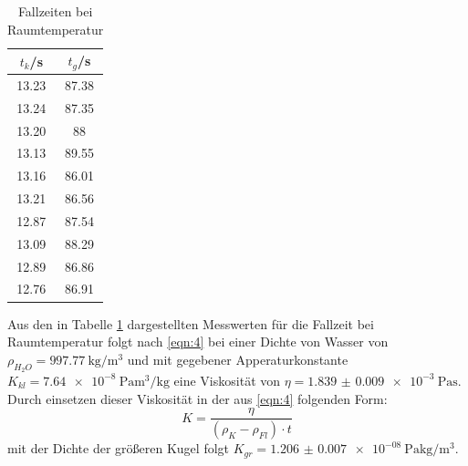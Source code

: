 \begin{table}[h]
  \centering
  \caption{Fallzeiten bei Raumtemperatur}
  \label{tab:3}
  \begin{tabular}{c c}
    \toprule
    $t_{k}$/\si{\second} & $t_{g}$/\si{\second} \\
    \midrule
    13.23 & 87.38 \\
    13.24 & 87.35 \\
    13.20 & 88 \\
    13.13 & 89.55 \\
    13.16 & 86.01 \\
    13.21 & 86.56 \\
    12.87 & 87.54 \\
    13.09 & 88.29 \\
    12.89 & 86.86 \\
    12.76 & 86.91 \\
    \bottomrule
  \end{tabular}
\end{table}
Aus den in Tabelle \ref{tab:3} dargestellten Messwerten für die Fallzeit bei Raumtemperatur
folgt nach \eqref{eqn:4} bei einer Dichte von Wasser von $\rho_{H_2O} = \SI[per-mode=reciprocal]{997.77}{\kilo\gram\per\cubic\metre}$
und mit gegebener Apperaturkonstante $K_{kl} = \SI[per-mode=reciprocal]{7.64e-8}{\pascal\cubic\metre\per\kilo\gram}$
eine Viskosität von $\eta = \SI{1.839(9)e-3}{\pascal\second}$.
Durch einsetzen dieser Viskosität in der aus \eqref{eqn:4} folgenden Form:
\begin{equation}
  K = \frac{\eta}{(\rho_K - \rho_{Fl}) \cdot t}
\end{equation}
mit der Dichte der größeren Kugel folgt $K_{gr} = \SI[per-mode=reciprocal]{1.206(7)e-08}{\pascal\kilo\gram\per\cubic\metre}$.
